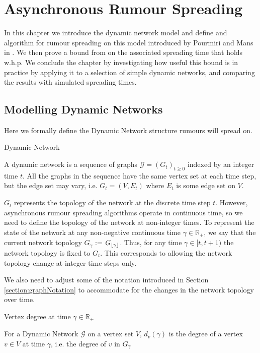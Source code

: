 \chapter{Asynchronous Rumour Spreading}
\label{chapter:AsyncUpperBound}

In this chapter we introduce the dynamic network model and define and algorithm for rumour spreading on this model introduced by Pourmiri and Mans in \cite{asyncPaper}. We then prove a bound from \cite{asyncPaper} on the associated spreading time that holds w.h.p. We conclude the chapter by investigating how useful this bound is in practice by applying it to a selection of simple dynamic networks, and comparing the results with simulated spreading times. 

\section{Modelling Dynamic Networks}

Here we formally define the Dynamic Network structure rumours will spread on.

\begin{definition}
	Dynamic Network

	\noindent
	A dynamic network is a sequence of graphs $\mathcal{G} = (G_t)_{t \geq 0}$ indexed by an integer time $t$. All the graphs in the sequence have the same vertex set at each time step, but the edge set may vary, i.e.  $G_t = (V, E_t)$ where $E_t$ is some edge set on $V$.
\end{definition}

$G_t$ represents the topology of the network at the discrete time step $t$. However, asynchronous rumour spreading algorithms operate in continuous time, so we need to define the topology of the network at non-integer times. To represent the state of the network at any non-negative continuous time $\gamma \in \mathbb{R}_+$, we say that the current network topology $G_\gamma$ := $G_{\lfloor\gamma\rfloor}$. Thus, for any time $\gamma \in [t, t + 1)$ the network topology is fixed to $G_t$. This corresponds to allowing the network topology change at integer time steps only.

We also need to adjust some of the notation introduced in Section \ref{section:graphNotation} to accommodate for the changes in the network topology over time.

\begin{definition}
	Vertex degree at time $\gamma \in \mathbb{R}_+ $ 

	\noindent
	For a Dynamic Network $\mathcal{G}$ on a vertex set $V$, $d_v(\gamma)$ is the degree of a vertex $v \in V$ at time $\gamma$, i.e. the degree of $v$ in $G_\gamma$
\end{definition}

